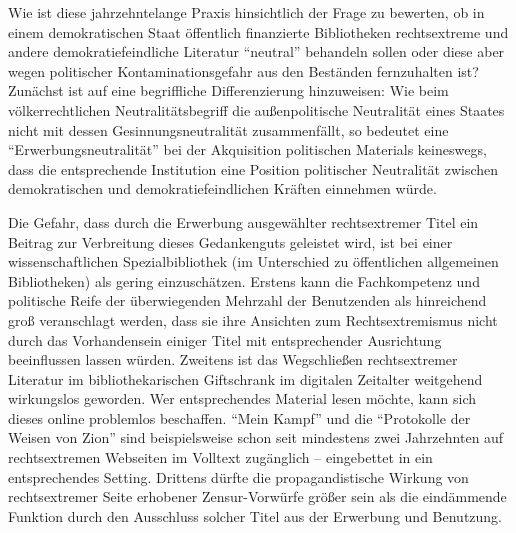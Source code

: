 \documentclass[a4paper,
fontsize=11pt,
oneside,
numbers=noperiodatend,
parskip=half-,
bibliography=totoc,
final
]{scrartcl}
\begin{document}
Wie ist diese jahrzehntelange Praxis hinsichtlich der Frage zu bewerten,
ob in einem demokratischen Staat öffentlich finanzierte Bibliotheken
rechtsextreme und andere demokratiefeindliche Literatur
\enquote{neutral} behandeln sollen oder diese aber wegen politischer
Kontaminationsgefahr aus den Beständen fernzuhalten ist? Zunächst ist
auf eine begriffliche Differenzierung hinzuweisen: Wie beim
völkerrechtlichen Neutralitätsbegriff die außenpolitische Neutralität
eines Staates nicht mit dessen Gesinnungsneutralität zusammenfällt, so
bedeutet eine \enquote{Erwerbungsneutralität} bei der Akquisition
politischen Materials keineswegs, dass die entsprechende Institution
eine Position politischer Neutralität zwischen demokratischen und
demokratiefeindlichen Kräften einnehmen würde.

Die Gefahr, dass durch die Erwerbung ausgewählter rechtsextremer Titel
ein Beitrag zur Verbreitung dieses Gedankenguts geleistet wird, ist bei
einer wissenschaftlichen Spezialbibliothek (im Unterschied zu
öffentlichen allgemeinen Bibliotheken) als gering einzuschätzen. Erstens
kann die Fachkompetenz und politische Reife der überwiegenden Mehrzahl
der Benutzenden als hinreichend groß veranschlagt werden, dass sie ihre
Ansichten zum Rechtsextremismus nicht durch das Vorhandensein einiger
Titel mit entsprechender Ausrichtung beeinflussen lassen würden.
Zweitens ist das Wegschließen rechtsextremer Literatur im
bibliothekarischen Giftschrank im digitalen Zeitalter weitgehend
wirkungslos geworden. Wer entsprechendes Material lesen möchte, kann
sich dieses online problemlos beschaffen. \enquote{Mein Kampf} und die
\enquote{Protokolle der Weisen von Zion} sind beispielsweise schon seit
mindestens zwei Jahrzehnten auf rechtsextremen Webseiten im Volltext
zugänglich -- eingebettet in ein entsprechendes Setting. Drittens dürfte
die propagandistische Wirkung von rechtsextremer Seite erhobener
Zensur-Vorwürfe größer sein als die eindämmende Funktion durch den
Ausschluss solcher Titel aus der Erwerbung und Benutzung.
\end{document}
